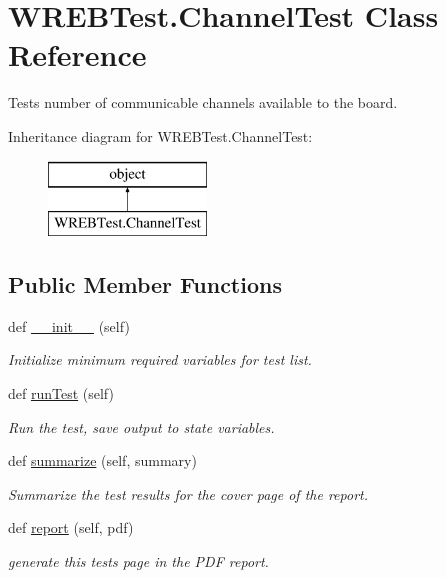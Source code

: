 \hypertarget{class_w_r_e_b_test_1_1_channel_test}{}\section{W\+R\+E\+B\+Test.\+Channel\+Test Class Reference}
\label{class_w_r_e_b_test_1_1_channel_test}


Tests number of communicable channels available to the board.  


Inheritance diagram for W\+R\+E\+B\+Test.\+Channel\+Test\+:\begin{figure}[H]
\begin{center}
\leavevmode
\includegraphics[height=2.000000cm]{class_w_r_e_b_test_1_1_channel_test}
\end{center}
\end{figure}
\subsection*{Public Member Functions}
\begin{DoxyCompactItemize}
\item 
def \hyperlink{class_w_r_e_b_test_1_1_channel_test_a52771dc0fe0c01373ebd9857bdaa45b1}{\+\_\+\+\_\+init\+\_\+\+\_\+} (self)
\begin{DoxyCompactList}\small\item\em Initialize minimum required variables for test list. \end{DoxyCompactList}\item 
def \hyperlink{class_w_r_e_b_test_1_1_channel_test_aad063c6ec4ec9b834f3799e1aa5d2d32}{run\+Test} (self)
\begin{DoxyCompactList}\small\item\em Run the test, save output to state variables. \end{DoxyCompactList}\item 
def \hyperlink{class_w_r_e_b_test_1_1_channel_test_a298393ff7375dbd2928d83b3fa1448c6}{summarize} (self, summary)
\begin{DoxyCompactList}\small\item\em Summarize the test results for the cover page of the report. \end{DoxyCompactList}\item 
def \hyperlink{class_w_r_e_b_test_1_1_channel_test_ad8a1c147448634960daaa8fe6d5f39af}{report} (self, pdf)
\begin{DoxyCompactList}\small\item\em generate this test\textquotesingle{}s page in the P\+DF report. \end{DoxyCompactList}\end{DoxyCompactItemize}


